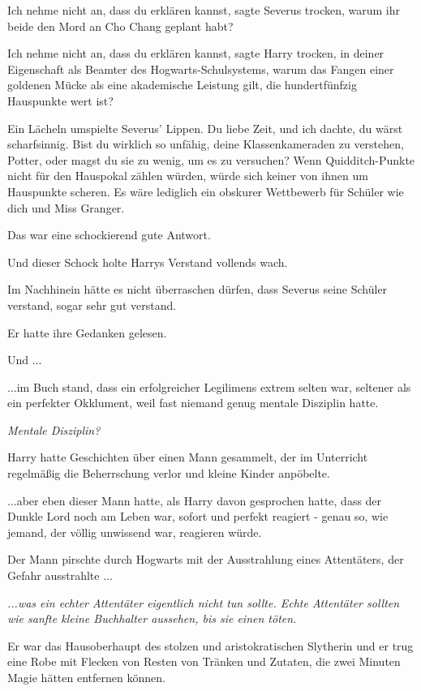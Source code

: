 \glqq{}Ich nehme nicht an, dass du erklären kannst\grqq{}, sagte Severus
trocken, \glqq{}warum ihr beide den Mord an Cho Chang geplant habt?\grqq{}

\glqq{}Ich nehme nicht an, dass du erklären kannst\grqq{}, sagte Harry trocken,
\glqq{}in deiner Eigenschaft als Beamter des Hogwarts-Schulsystems, warum das
Fangen einer goldenen Mücke als eine akademische Leistung gilt, die
hundertfünfzig Hauspunkte wert ist?\grqq{}

Ein Lächeln umspielte Severus' Lippen. \glqq{}Du liebe Zeit, und ich dachte, du
wärst scharfsinnig. Bist du wirklich so unfähig, deine Klassenkameraden zu
verstehen, Potter, oder magst du sie zu wenig, um es zu versuchen? Wenn
Quidditch-Punkte nicht für den Hauspokal zählen würden, würde sich keiner von
ihnen um Hauspunkte scheren. Es wäre lediglich ein obskurer Wettbewerb für
Schüler wie dich und Miss Granger.\grqq{}

Das war eine schockierend gute Antwort.

Und dieser Schock holte Harrys Verstand vollends wach.

Im Nachhinein hätte es nicht überraschen dürfen, dass Severus seine Schüler
verstand, sogar sehr gut verstand.

Er hatte ihre Gedanken gelesen.

Und ...

...im Buch stand, dass ein erfolgreicher Legilimens extrem selten war, seltener
als ein perfekter Okklument, weil fast niemand genug mentale Disziplin hatte.

\emph{Mentale Disziplin?}

Harry hatte Geschichten über einen Mann gesammelt, der im Unterricht regelmäßig
die Beherrschung verlor und kleine Kinder anpöbelte.

...aber eben dieser Mann hatte, als Harry davon gesprochen hatte, dass der
Dunkle Lord noch am Leben war, sofort und perfekt reagiert - genau so, wie
jemand, der völlig unwissend war, reagieren würde.

Der Mann pirschte durch Hogwarts mit der Ausstrahlung eines Attentäters, der
Gefahr ausstrahlte ...

\emph{...was ein echter Attentäter eigentlich nicht tun sollte. Echte Attentäter
sollten wie sanfte kleine Buchhalter aussehen, bis sie einen töten.}

Er war das Hausoberhaupt des stolzen und aristokratischen Slytherin und er trug
eine Robe mit Flecken von Resten von Tränken und Zutaten, die zwei Minuten Magie
hätten entfernen können.

